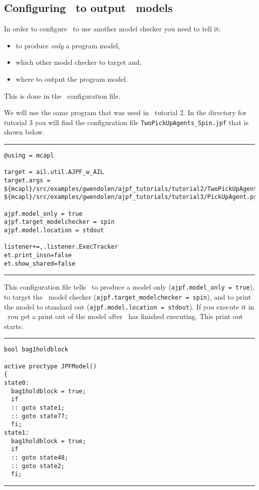 \documentclass[a4]{article}
\begin{document}
\subsection{Configuring \ajpf\ to output \spin\ models}
\label{sec:configure_spin}

In order to configure \ajpf\ to use another model checker you need to tell it:
\begin{itemize}
\item to produce \emph{only} a program model, 
\item which other model checker to target and, 
\item where to output the program model.
\end{itemize}  This is done in the \ajpf\ configuration file.  

We will use the same program that was used in \ajpf\ tutorial 2.  In the directory for tutorial 3 you will find the configuration file \texttt{TwoPickUpAgents\_Spin.jpf} that is shown below.

\noindent\rule{\textwidth}{1pt}
\begin{small}
\begin{verbatim}
@using = mcapl

target = ail.util.AJPF_w_AIL
target.args = ${mcapl}/src/examples/gwendolen/ajpf_tutorials/tutorial2/TwoPickUpAgents.ail,
${mcapl}/src/examples/gwendolen/ajpf_tutorials/tutorial3/PickUpAgent.psl,1

ajpf.model_only = true
ajpf.target_modelchecker = spin
ajpf.model.location = stdout

listener+=,.listener.ExecTracker
et.print_insn=false
et.show_shared=false
\end{verbatim}
\end{small}
\rule{\textwidth}{1pt}

This configuration file tells \ajpf\ to produce a model only (\texttt{ajpf.model\_only = true}), to target the \spin\ model checker (\texttt{ajpf.target\_modelchecker = spin}), and to print the model to standard out (\texttt{ajpf.model.location = stdout}).  If you execute it in \ajpf\ you get a print out of the model after \ajpf\  has finished executing.  This print out starts:

\noindent\rule{\textwidth}{1pt}
\begin{small}
\begin{verbatim}
bool bag1holdblock

active proctype JPFModel()
{
state0:
  bag1holdblock = true;
  if
  :: goto state1;
  :: goto state77;
  fi;
state1:
  bag1holdblock = true;
  if
  :: goto state48;
  :: goto state2;
  fi;
\end{verbatim}
\end{small}
\rule{\textwidth}{1pt}
\end{document}

